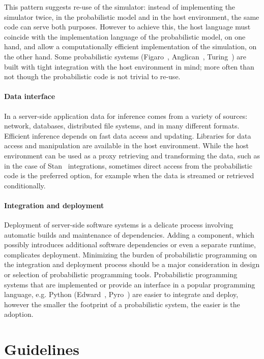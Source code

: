 \documentclass[sigplan,review,10pt,anonymous]{acmart}
\begin{document}
\begin{sloppypar}
This pattern suggests re-use of the simulator: instead of
implementing the simulator twice, in the probabilistic model and
in the host environment, the same code can serve both purposes.
However to achieve this, the host language must coincide with
the implementation language of the probabilistic model, on one
hand, and allow a computationally efficient implementation of
the simulation, on the other hand. Some probabilistic systems
(Figaro~\cite{P09}, Anglican~\cite{TMY+16}, Turing~\cite{GXG18})
are built with tight integration with the host environment in
mind; more often than not though the probabilistic code is
not trivial to re-use.

\paragraph{Data interface} In a server-side application data
for inference comes from a variety of sources: network,
databases, distributed file systems, and in many different
formats. Efficient inference depends on fast data access and
updating. Libraries for data access and manipulation are
available in the host environment. While the host environment
can be used as a proxy retrieving and transforming the data,
such as in the case of Stan~\cite{Stan17} integrations,
sometimes direct access from the probabilistic code is the
preferred option, for example when the data is streamed or
retrieved conditionally. 

\paragraph{Integration and deployment} Deployment of server-side
software systems is a delicate process involving automatic
builds and maintenance of dependencies. Adding  a component,
which possibly introduces additional software dependencies or
even a separate runtime, complicates deployment. Minimizing the
burden of probabilistic programming on the integration
and deployment process should be a major consideration in
design or selection of probabilistic programming tools.
Probabilistic programming systems that are implemented or 
provide an interface in a popular programming language, e.g.
Python (Edward~\cite{THS+17}, Pyro~\cite{BCJ+19}) are easier
to integrate and deploy, however the smaller the footprint
of a probabilistic system, the easier is the adoption.

\section{Guidelines}


\end{sloppypar}
\end{document}
